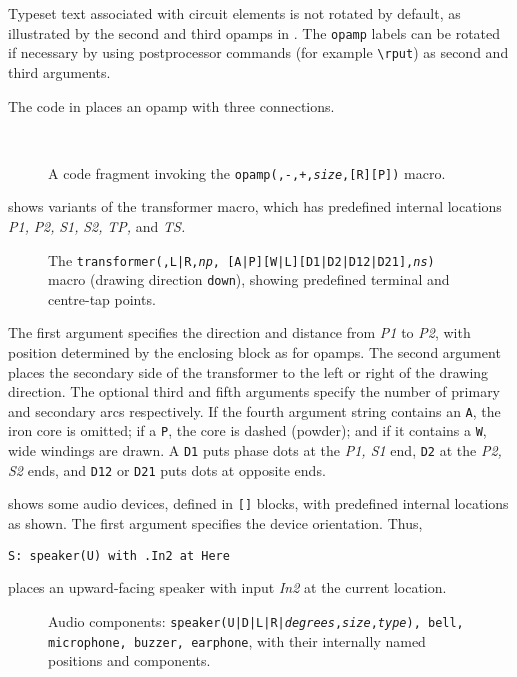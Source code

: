Typeset text associated with circuit elements is not rotated by default,
as illustrated by the second and third opamps in .
The {\tt opamp} labels can be rotated if necessary by 
using postprocessor commands (for example \PSTricks \verb|\rput|)
as second and third arguments.

The code in  places an opamp with three connections.
\begin{figure}[h!b]
   \parbox{4in}{\small }%
   \quad\raise-0.2in\hbox{ }%
   \caption{A code fragment invoking the
    {\tt opamp(\linespec,-,+,{\sl size},[R][P])} macro.}
   \label{oax}
   \end{figure}

 shows variants of the transformer macro,
which has predefined internal locations
{\sl P1,} {\sl P2,} {\sl S1,} {\sl S2,} {\sl TP,} and {\sl TS.}
\begin{figure}[h!t]
   
  \caption{The {\tt transformer(\linespec,L|R,{\sl np},%
[A|P][W|L][D1|D2|D12|D21],{\sl ns})}
     macro (drawing direction {\tt down}), showing predefined terminal
     and centre-tap points.}
   \label{Xform}
   \end{figure}
The first argument
specifies the direction and distance from {\sl P1} to {\sl P2}, with
position determined by the enclosing block as for opamps.  The second
argument places the secondary side of the transformer to the left
or right of the drawing direction.  The optional third and fifth arguments
specify the number of primary and secondary arcs respectively.
If the fourth argument string contains an {\tt A}, the iron core
is omitted; 
if a {\tt P}, the core is dashed (powder);
and if it contains a {\tt W}, wide windings are drawn.
A {\tt D1} puts phase dots at the {\sl P1, S1} end, {\tt D2} at the
{\sl P2, S2} ends, and {\tt D12} or {\tt D21} puts dots at opposite ends.

 shows some audio devices, defined in {\tt []} blocks,
with predefined internal locations as shown.
The first argument specifies the device orientation.
Thus,
\par
{\tt S: speaker(U) with .In2 at Here}

\noindent
places an upward-facing speaker with input {\sl In2} at the
current location.
\begin{figure}[ht]
   
   \caption{Audio components:
   {\tt speaker(U|D|L|R|{\sl degrees},{\sl size},{\sl type}),
     bell, microphone, buzzer,
     earphone}, with their internally named positions and components.}
   \label{Audio}
   \end{figure}

